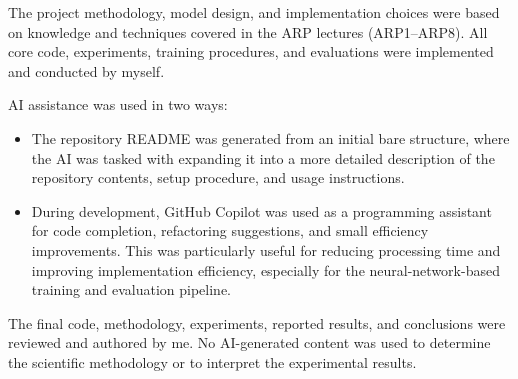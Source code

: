 \documentclass[12pt]{article}
\begin{document}
The project methodology, model design, and implementation choices were based on knowledge and techniques covered in the ARP lectures (ARP1--ARP8). All core code, experiments, training procedures, and evaluations were implemented and conducted by myself.

AI assistance was used in two ways:

\begin{itemize} 
    \item The repository README was generated from an initial bare structure, where the AI was tasked with expanding it into a more detailed description of the repository contents, setup procedure, and usage instructions. 
    \item During development, GitHub Copilot was used as a programming assistant for code completion, refactoring suggestions, and small efficiency improvements. This was particularly useful for reducing processing time and improving implementation efficiency, especially for the neural-network-based training and evaluation pipeline. 
\end{itemize}

The final code, methodology, experiments, reported results, and conclusions were reviewed and authored by me. No AI-generated content was used to determine the scientific methodology or to interpret the experimental results.
\end{document}
